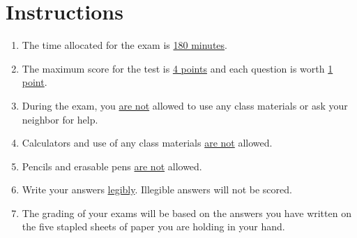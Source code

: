 \section*{Instructions}
\begin{enumerate}
    \item The time allocated for the exam is \underline{180 minutes}.
    \item The maximum score for the test is \underline{4 points} and each question is worth \underline{1 point}.
    \item During the exam, you \underline{are not} allowed to use any class materials or ask your neighbor for help.
    \item Calculators and use of any class materials \underline{are not} allowed.
    \item Pencils and erasable pens \underline{are not} allowed.
    \item Write your answers \underline{legibly}. Illegible answers will not be scored.
    \item The grading of your exams will be based on the answers you have written on the five stapled sheets of paper you are holding in your hand.
    \vfill
\end{enumerate}